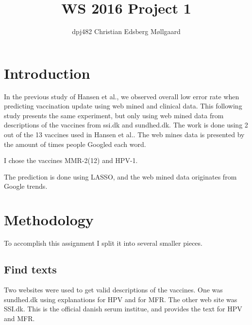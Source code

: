 \documentclass{sig-alternate}
\begin{document}
\title{WS 2016 Project 1}
\author{
\alignauthor 
dpj482 Christian Edsberg Møllgaard
}
\maketitle



\section{Introduction}
In the previous study of Hansen et al.\cite{H2016}, we observed overall low error rate when predicting vaccination update using web mined and clinical data. This following study presents the same experiment, but only using web mined data from descriptions of the vaccines from ssi.dk\cite{web1} and sundhed.dk\cite{web2}. The work is done using 2 out of the 13 vaccines used in Hansen et al.\cite{H2016}. The web mines data is presented by the amount of times people Googled each word.



I chose the vaccines MMR-2(12) and HPV-1.

The prediction is done using LASSO, and the web mined data originates from Google trends.\cite{trends}

\section{Methodology}
To accomplish this assignment I split it into several smaller pieces. 
\subsection*{Find texts}
Two websites were used to get valid descriptions of the vaccines. One was sundhed.dk\cite{web2} using explanations for HPV\cite{sund0} and for MFR\cite{sund1}. 
The other web site was SSI.dk. This is the official danish serum institue, and provides the text for HPV\cite{ssi0} and MFR\cite{ssi1}.
\end{document}
